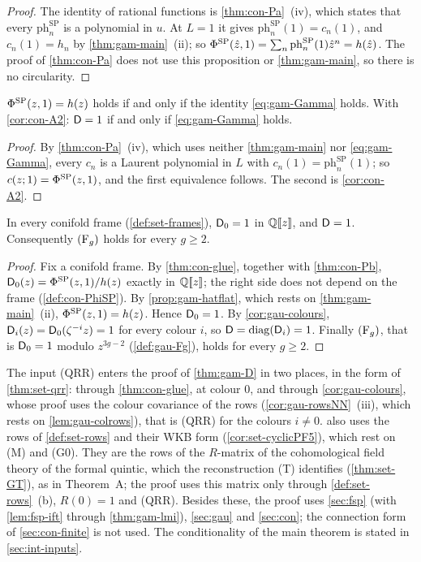 \begin{proof}
The identity of rational functions is \cref{thm:con-Pa}~(iv), which states that every $\mathrm{ph}^{\mathrm{SP}}_n$ is a polynomial in $u$. At $L=1$ it gives $\mathrm{ph}^{\mathrm{SP}}_n(1)=c_n(1)$, and $c_n(1)=h_n$ by \cref{thm:gam-main}~(ii); so $\Phi^{\mathrm{SP}}(\hat{z},1)=\sum_n\mathrm{ph}^{\mathrm{SP}}_n(1)\hat{z}^n=h(\hat{z})$. The proof of \cref{thm:con-Pa} does not use this proposition or \cref{thm:gam-main}, so there is no circularity.
\end{proof}

\begin{cor}
\label{cor:gam-equiv}
$\Phi^{\mathrm{SP}}(z,1)=h(z)$ holds if and only if the identity \eqref{eq:gam-Gamma} holds. With \cref{cor:con-A2}: $\mathsf{D}=1$ if and only if \eqref{eq:gam-Gamma} holds.
\end{cor}

\begin{proof}
By \cref{thm:con-Pa}~(iv), which uses neither \cref{thm:gam-main} nor \eqref{eq:gam-Gamma}, every $c_n$ is a Laurent polynomial in $L$ with $c_n(1)=\mathrm{ph}^{\mathrm{SP}}_n(1)$; so $c(z;1)=\Phi^{\mathrm{SP}}(z,1)$, and the first equivalence follows. The second is \cref{cor:con-A2}.
\end{proof}

\begin{thm}
\label{thm:gam-D}
In every conifold frame (\cref{def:set-frames}), $\mathsf{D}_0=1$ in $\mathbb{Q}[\![ z ]\!]$, and $\mathsf{D}=1$. Consequently $(\mathrm{F}_{g})$ holds for every $g\geq 2$.
\end{thm}

\begin{proof}
Fix a conifold frame. By \cref{thm:con-glue}, together with \cref{thm:con-Pb}, $\mathsf{D}_0(z)=\Phi^{\mathrm{SP}}(z,1)/h(z)$ exactly in $\mathbb{Q}[\![ z ]\!]$; the right side does not depend on the frame (\cref{def:con-PhiSP}). By \cref{prop:gam-hatflat}, which rests on \cref{thm:gam-main}~(ii), $\Phi^{\mathrm{SP}}(z,1)=h(z)$. Hence $\mathsf{D}_0=1$. By \cref{cor:gau-colours}, $\mathsf{D}_i(z)=\mathsf{D}_0(\zeta^{-i}z)=1$ for every colour $i$, so $\mathsf{D}=\operatorname{diag}(\mathsf{D}_i)=1$. Finally $(\mathrm{F}_{g})$, that is $\mathsf{D}_0=1$ modulo $z^{3g-2}$ (\cref{def:gau-Fg}), holds for every $g\geq 2$.
\end{proof}

The input (QRR) enters the proof of \cref{thm:gam-D} in two places, in the form of \cref{thm:set-qrr}: through \cref{thm:con-glue}, at colour $0$, and through \cref{cor:gau-colours}, whose proof uses the colour covariance of the rows (\cref{cor:gau-rowsNN}~(iii), which rests on \cref{lem:gau-colrows}), that is (QRR) for the colours $i\neq0$.  also uses the rows of \cref{def:set-rows} and their WKB form (\cref{cor:set-cyclicPF5}), which rest on (M) and (G0). They are the rows of the $R$-matrix of the cohomological field theory of the formal quintic, which the reconstruction (T) identifies (\cref{thm:set-GT}), as in Theorem~A; the proof uses this matrix only through \cref{def:set-rows}~(b), $R(0)=1$ and (QRR). Besides these, the proof uses \cref{sec:fsp} (with \cref{lem:fsp-ift} through \cref{thm:gam-lmi}), \cref{sec:gau} and \cref{sec:con}; the connection form of \cref{sec:con-finite} is not used. The conditionality of the main theorem is stated in \cref{sec:int-inputs}.

